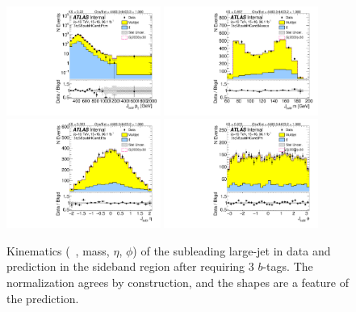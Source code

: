 \begin{figure}[htbp!]
\begin{center}
\includegraphics[width=0.45\textwidth,angle=-90]{figures/boosted/Sideband/b77_ThreeTag_Sideband_sublHCand_Pt_m_1.pdf}
\includegraphics[width=0.45\textwidth,angle=-90]{figures/boosted/Sideband/b77_ThreeTag_Sideband_sublHCand_Mass_s.pdf}\\
\includegraphics[width=0.45\textwidth,angle=-90]{figures/boosted/Sideband/b77_ThreeTag_Sideband_sublHCand_Eta.pdf}
\includegraphics[width=0.45\textwidth,angle=-90]{figures/boosted/Sideband/b77_ThreeTag_Sideband_sublHCand_Phi.pdf}
  \caption{Kinematics (\pt~, mass, $\eta$, $\phi$) of the subleading large-\R jet in data and prediction in the sideband region after requiring 3 $b$-tags. The normalization agrees by construction, and the shapes are a feature of the prediction.}
  \label{fig:boosted-3b-sideband-ak10-subl}
\end{center}
\end{figure}

